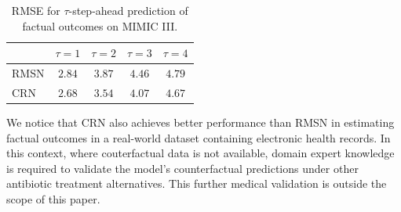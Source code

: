 \documentclass{article} %
\begin{document}
    \begin{table}[ht]
    		\caption{RMSE for $\tau$-step-ahead prediction of factual outcomes on MIMIC III.}
    		\label{tab:results_sequence_prediction_mimic}
    		\vskip 0.05in
    		\begin{center}
    				\begin{tabular}{lcccc}
    					\toprule
    					& $\tau=1$ & $\tau=2$ & $\tau=3$  & $\tau=4$   \\
    					\hline
    					RMSN & $2.84$ & $3.87$ & $4.46$ & $4.79$ \\
    					CRN &  $2.68$ & $3.54$  &  $4.07$  & $4.67$ \\
    					\bottomrule
    				\end{tabular}
    		
    		\end{center}
    		\vskip -0.1in
    \end{table}

    We notice that CRN also achieves better performance than RMSN in estimating factual outcomes in a real-world dataset containing electronic health records. In this context, where couterfactual data is not available, domain expert knowledge is required to validate the model's counterfactual predictions under other antibiotic treatment alternatives. This further medical validation is outside the scope of this paper.  
   
\end{document}
